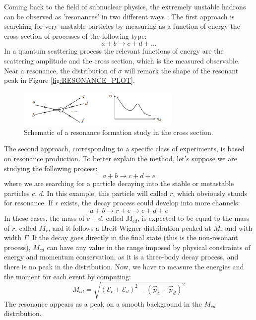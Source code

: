 Coming back to the field of subnuclear physics, the extremely unstable hadrons can be observed as 'resonances' in two different ways \cite{bettini}. The first approach is searching for very unstable particles by measuring as a function of energy the cross-section of processes of the following type:
\begin{equation}
	a + b \rightarrow c + d + \dots
\end{equation}
In a quantum scattering process the relevant functions of energy are the scattering amplitude and the cross section, which is the measured observable. Near a resonance, the distribution of $\sigma$ will remark the shape of the resonant peak in Figure \ref{fig:RESONANCE_PLOT}.

\begin{figure}[H]
	\centering
	\includegraphics[width=0.7\textwidth]{Images/LHC/cross_section_resonance.PNG}
	\caption{Schematic of a resonance formation study in the cross section.}
	\label{fig:CROSS_SECTION_RESONANCE}
\end{figure}

The second approach, corresponding to a specific class of experiments, is based on resonance production. To better explain the method, let's suppose we are studying the following process:
\begin{equation}
	a + b \rightarrow c + d + e
\end{equation}
where we are searching for a particle decaying into the stable or metastable particles $c$, $d$. In this example, this particle will called $r$, which obviously stands for resonance. If $r$ exists, the decay process could develop into more channels:
\begin{equation}
	a + b \rightarrow r + e \rightarrow c + d + e
\end{equation}
In these cases, the mass of $c+d$, called $M_{cd}$, is expected to be equal to the mass of $r$, called $M_{r}$, and it follows a Breit-Wigner distribution peaked at $M_{r}$ and with width $\Gamma$. If the decay goes directly in the final state (this is the non-resonant process), $M_{cd}$ can have any value in the range imposed by physical constraints of energy and momentum conservation, as it is a three-body decay process, and there is no peak in the distribution. Now, we have to measure the energies and the moment for each event by computing:
\begin{equation}
	M_{cd} = \sqrt{(\mathcal{E}_{c} + \mathcal{E}_{d})^2 - (\vec{p}_{c} + \vec{p}_{d})^2}
\end{equation}
The resonance appears as a peak on a smooth background in the $M_{cd}$ distribution.

